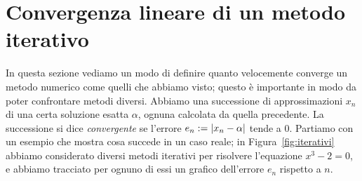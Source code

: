 \documentclass[a4paper]{report}
\DeclarePairedDelimiter{\abs}{\lvert}{\rvert}
\theoremstyle{definiton}
\theoremstyle{remark}
\begin{document}
\section{Convergenza lineare di un metodo iterativo}

In questa sezione vediamo un modo di definire quanto velocemente converge un metodo numerico come quelli che abbiamo visto; 
questo è importante in modo da poter confrontare metodi diversi. Abbiamo una successione di approssimazioni $x_n$ di una certa soluzione esatta $\alpha$, ognuna calcolata da quella precedente. La successione si dice \emph{convergente} se l'errore $e_n := \abs{x_n - \alpha}$ tende a $0$. Partiamo con un esempio che mostra cosa succede in un caso reale; in Figura~\ref{fig:iterativi} abbiamo considerato diversi metodi iterativi per risolvere l'equazione $x^3-2 = 0$, e abbiamo tracciato per ognuno di essi un grafico dell'errore $e_n$ rispetto a $n$.
\end{document}
